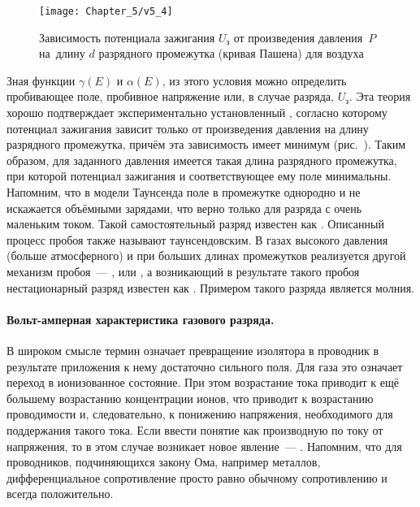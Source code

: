 \begin{figure}[h!]
	\centering
	\texttt{[image: Chapter\_5/v5\_4]}
	\caption{Зависимость потенциала зажигания $U_\text{з}$ от произведения
давления~$P$ на~длину $d$ разрядного промежутка (кривая Пашена) для воздуха}
\end{figure}


Зная функции $\gamma(E)$ и $\alpha(E)$, из этого условия можно определить
пробивающее поле, пробивное напряжение или, в
случае разряда,  $U_\text{з}$. Эта теория хорошо
подтверждает экспериментально установленный
, согласно которому потенциал зажигания зависит только
от произведения давления на длину разрядного
промежутка, причём эта зависимость имеет минимум (рис.~).
Таким образом, для заданного давления имеется такая длина
разрядного промежутка, при которой потенциал зажигания и соответствующее ему
поле минимальны. Напомним, что в модели
Таунсенда поле в промежутке однородно и не искажается объёмными зарядами, что
верно только для разряда с очень маленьким
током. Такой самостоятельный разряд известен как . Описанный процесс пробоя также
называют таунсендовским. В газах высокого давления (больше атмосферного) и при
больших длинах промежутков реализуется
другой механизм пробоя~--- , или , а
возникающий в результате такого пробоя
нестационарный разряд известен как . Примером такого разряда
является молния.

\paragraph{Вольт-амперная характеристика газового разряда.}

В широком смысле термин  означает превращение
изолятора в проводник в результате приложения к
нему достаточно сильного поля. Для газа это означает переход в ионизованное
состояние. При этом возрастание тока
приводит к ещё большему возрастанию концентрации ионов, что приводит к
возрастанию проводимости и, следовательно, к
понижению напряжения, необходимого для поддержания такого тока. Если ввести
понятие  как производную по току от напряжения, то в этом случае возникает
новое явление~--- . Напомним, что для проводников, подчиняющихся
закону Ома, например металлов,
дифференциальное сопротивление просто равно обычному сопротивлению и всегда
положительно.


